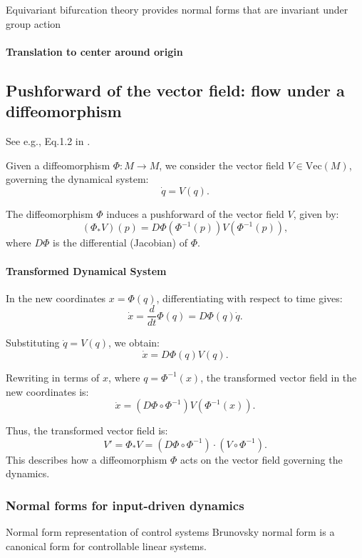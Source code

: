 \documentclass{article}
\theoremstyle{definition} \newtheorem{definition}{Definition}  \newtheorem{example}{Example}
\theoremstyle{remark} \newtheorem{remark}{Remark}
\newcounter{ct}
\begin{document}
Equivariant bifurcation theory provides normal forms that are invariant under group action


\paragraph{Translation to center around origin}




\subsection{Pushforward of the vector field: flow under a diffeomorphism}
See e.g., Eq.1.2 in \citep{agrachev2013control}.

Given a diffeomorphism \( \Phi: M \to M \), we consider the vector field \( V \in \text{Vec}(M) \), governing the dynamical system:
\[
\dot{q} = V(q).
\]

The diffeomorphism \( \Phi \) induces a pushforward of the vector field \( V \), given by:
\[
(\Phi_* V)(p) = D\Phi(\Phi^{-1}(p)) V(\Phi^{-1}(p)),
\]
where \( D\Phi \) is the differential (Jacobian) of \( \Phi \).  

\paragraph{Transformed Dynamical System}
In the new coordinates \( x = \Phi(q) \), differentiating with respect to time gives:
\[
\dot{x} = \frac{d}{dt} \Phi(q) = D\Phi(q) \dot{q}.
\]

Substituting \( \dot{q} = V(q) \), we obtain:
\[
\dot{x} = D\Phi(q) V(q).
\]

Rewriting in terms of \( x \), where \( q = \Phi^{-1}(x) \), the transformed vector field in the new coordinates is:
\[
\dot{x} = (D\Phi \circ \Phi^{-1}) V(\Phi^{-1}(x)).
\]

Thus, the transformed vector field is:
\[
V' = \Phi_* V = (D\Phi \circ \Phi^{-1}) \cdot (V \circ \Phi^{-1}).
\]
This describes how a diffeomorphism \( \Phi \) acts on the vector field governing the dynamics.




\subsubsection{Normal forms for input-driven dynamics}
Normal form representation of control systems  \citep{gilbert1963controllability}
Brunovsky normal form is a canonical form for controllable linear systems.
\end{document}
